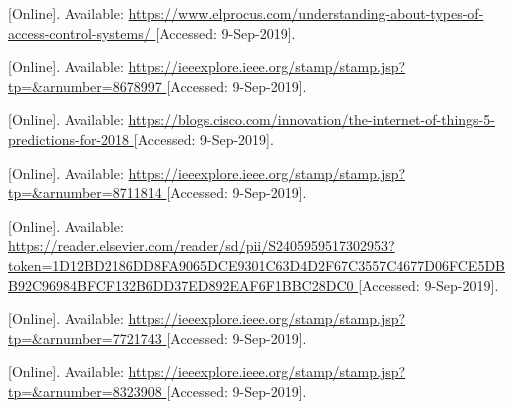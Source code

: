 \begin{thebibliography}{9}


[Online]. Available:
\url{
https://www.elprocus.com/understanding-about-types-of-access-control-systems/
}
[Accessed: 9-Sep-2019].




[Online]. Available:
\url{
https://ieeexplore.ieee.org/stamp/stamp.jsp?tp=&arnumber=8678997
}
[Accessed: 9-Sep-2019].



[Online]. Available:
\url{
https://blogs.cisco.com/innovation/the-internet-of-things-5-predictions-for-2018
}
[Accessed: 9-Sep-2019].



[Online]. Available:
\url{
https://ieeexplore.ieee.org/stamp/stamp.jsp?tp=&arnumber=8711814
}
[Accessed: 9-Sep-2019].



[Online]. Available:
\url{
https://reader.elsevier.com/reader/sd/pii/S2405959517302953?token=1D12BD2186DD8FA9065DCE9301C63D4D2F67C3557C4677D06FCE5DBB92C96984BFCF132B6DD37ED892EAF6F1BBC28DC0
}
[Accessed: 9-Sep-2019].


[Online]. Available:
\url{
https://ieeexplore.ieee.org/stamp/stamp.jsp?tp=&arnumber=7721743
}
[Accessed: 9-Sep-2019].


[Online]. Available:
\url{
https://ieeexplore.ieee.org/stamp/stamp.jsp?tp=&arnumber=8323908
}
[Accessed: 9-Sep-2019].








\end{thebibliography}
